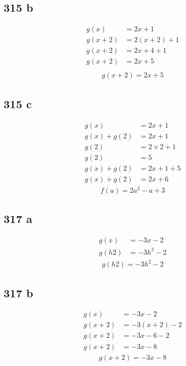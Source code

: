 \documentclass{article}
\begin{document}
    \subsection*{315 b}
    \begin{align*}
        g(x) &= 2x +1 \\
        g(x + 2) &= 2(x + 2) + 1\\
        g(x + 2) &= 2x + 4 + 1\\
        g(x + 2) &= 2x + 5\\
    \end{align*}
    \begin{align*}
        \boxed{ g(x + 2) = 2x + 5}
    \end{align*}

    \subsection*{315 c}
    \begin{align*}
        g(x) &= 2x +1 \\
        g(x) + g(2) &= 2x +1\\
        g(2) &= 2 \times 2 + 1\\
        g(2) &= 5\\
        g(x) + g(2) &= 2x +1 + 5\\
        g(x) + g(2) &= 2x +6
    \end{align*}
    \begin{align*}
        \boxed{f(a) = 2a^2 - a + 3}
    \end{align*}

    \subsection*{317 a}
    \begin{align*}
        g(x) &= -3x - 2 \\
        g(h2) &= -3h^2  -2
    \end{align*}
    \begin{align*}
        \boxed{g(h2) = -3h^2  -2}
    \end{align*}

    \subsection*{317 b}
    \begin{align*}
        g(x) &= -3x - 2 \\
        g(x + 2) &= -3(x + 2) - 2\\
        g(x + 2) &= -3x - 6 - 2\\
        g(x + 2) &= -3x - 8
    \end{align*}
    \begin{align*}
        \boxed{g(x + 2) = -3x - 8}
    \end{align*}
\end{document}
